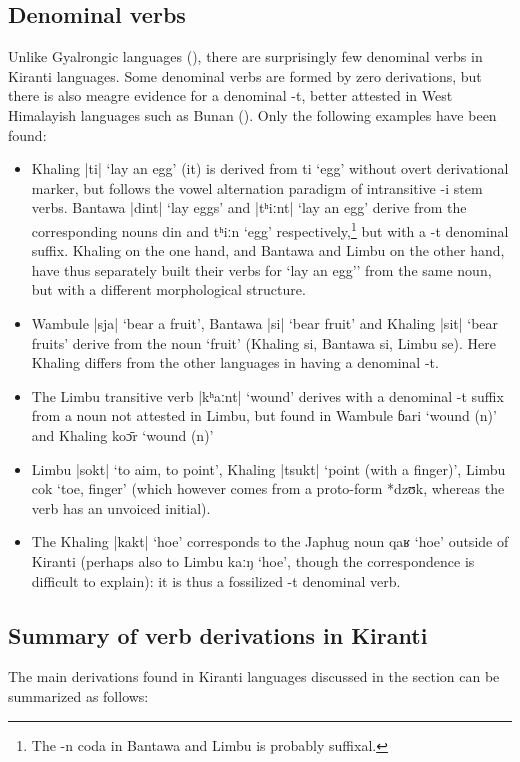 \documentclass[oneside,a4paper,11pt]{article}
\newcommand{\ipa}[1]{{\phon\mbox{#1}}} %
\newcommand{\dhatu}[2]{|\ipa{#1}| `#2'}
\begin{document}
\subsection{Denominal verbs} \label{sec:denom}
Unlike Gyalrongic languages (\citealt{jacques14antipassive}), there are surprisingly few denominal verbs in Kiranti languages. Some denominal verbs are formed by zero derivations, but there is also meagre evidence for a denominal \ipa{-t}, better attested in West Himalayish languages such as Bunan (\citealt[426]{widmer14bunan}). Only the following examples have been found:
\begin{itemize}
\item Khaling \dhatu{ti}{lay an egg} (it) is derived from \ipa{ti} `egg' without overt derivational marker, but follows the vowel alternation paradigm of intransitive \ipa{-i} stem verbs. Bantawa \dhatu{dint}{lay eggs} and \dhatu{tʰiːnt}{lay an egg} derive from the corresponding nouns  \ipa{din} and \ipa{tʰiːn} `egg' respectively,\footnote{The \ipa{-n} coda in Bantawa and Limbu is probably suffixal.} but with a \ipa{-t} denominal suffix. Khaling on the one hand, and Bantawa and Limbu on the other hand, have thus separately built their verbs for `lay an egg'' from the same noun, but with a different morphological structure.
\item Wambule \dhatu{sja}{bear a fruit}, Bantawa  \dhatu{si}{bear fruit} and Khaling \dhatu{sit}{bear fruits} derive from the noun `fruit' (Khaling \ipa{si},  Bantawa \ipa{si}, Limbu \ipa{se}). Here Khaling differs from the other languages in having a denominal \ipa{-t}.
 \item The Limbu transitive verb \dhatu{kʰaːnt}{wound} derives with a denominal \ipa{-t} suffix from a noun not attested in Limbu, but found in Wambule \ipa{ɓari} `wound (n)' and Khaling \ipa{koɔ̄r} `wound (n)'
 \item Limbu \dhatu{sokt}{to aim, to point}, Khaling \dhatu{tsukt}{point (with a finger)}, Limbu \ipa{cok} `toe, finger' (which however comes from a proto-form *\ipa{dzʊk}, whereas the verb has an unvoiced initial).
 \item The Khaling \dhatu{kakt}{hoe} corresponds to the Japhug noun \ipa{qaʁ} `hoe' outside of Kiranti (perhaps also to Limbu \ipa{kaːŋ} `hoe', though the correspondence is difficult to explain): it is thus a fossilized \ipa{-t} denominal verb.
\end{itemize}  

\subsection{Summary of verb derivations in Kiranti}
The main derivations found in Kiranti languages discussed in the section can be summarized as follows:
\end{document}
